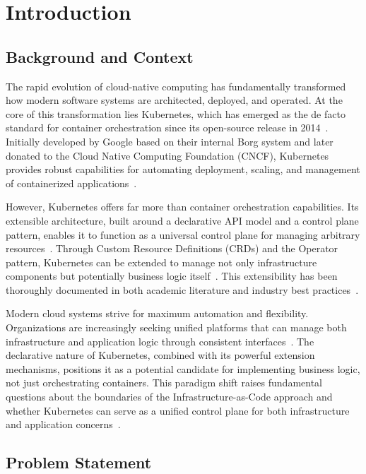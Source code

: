 \chapter{Introduction}\label{chap:intro}

\section{Background and Context}

The rapid evolution of cloud-native computing has fundamentally transformed how modern software systems are architected, deployed, and operated. At the core of this transformation lies Kubernetes, which has emerged as the de facto standard for container orchestration since its open-source release in 2014~\cite{kubernetes, luksa2017}. Initially developed by Google based on their internal Borg system and later donated to the Cloud Native Computing Foundation (CNCF), Kubernetes provides robust capabilities for automating deployment, scaling, and management of containerized applications~\cite{cncf, hightower2017}.

However, Kubernetes offers far more than container orchestration capabilities. Its extensible architecture, built around a declarative API model and a control plane pattern, enables it to function as a universal control plane for managing arbitrary resources~\cite{kubernetes_declarative_automation}. Through Custom Resource Definitions (CRDs) and the Operator pattern, Kubernetes can be extended to manage not only infrastructure components but potentially business logic itself~\cite{crd_kubernetes, operator_pattern, dobies2020}. This extensibility has been thoroughly documented in both academic literature and industry best practices~\cite{hausenblas2019, ibryam2020}.

Modern cloud systems strive for maximum automation and flexibility. Organizations are increasingly seeking unified platforms that can manage both infrastructure and application logic through consistent interfaces~\cite{kubernetes_multivocal_review}. The declarative nature of Kubernetes, combined with its powerful extension mechanisms, positions it as a potential candidate for implementing business logic, not just orchestrating containers. This paradigm shift raises fundamental questions about the boundaries of the Infrastructure-as-Code approach and whether Kubernetes can serve as a unified control plane for both infrastructure and application concerns~\cite{morris2020iac}.

\section{Problem Statement}

